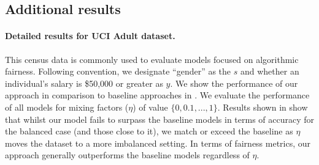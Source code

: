 
\subsection{Additional results}\label{sec:additional-results}
\paragraph{Detailed results for UCI Adult dataset.}
This census data is commonly used to evaluate models focused on algorithmic fairness.
Following convention, we designate ``gender'' as the $s$ and whether an individual's salary is \$50,000 or greater as $y$.
We show the performance of our approach in comparison to baseline approaches in .
We evaluate the performance of all models for mixing factors ($\eta$) of value $\{0, 0.1, ..., 1\}$. 
Results shown in  show that whilst our model fails to surpass the baseline models in terms of accuracy for the balanced case (and those close to it), we match or exceed the baseline as $\eta $ moves the dataset to a more imbalanced setting. In terms of fairness metrics,  our approach generally outperforms the baseline models regardless of $\eta$.

